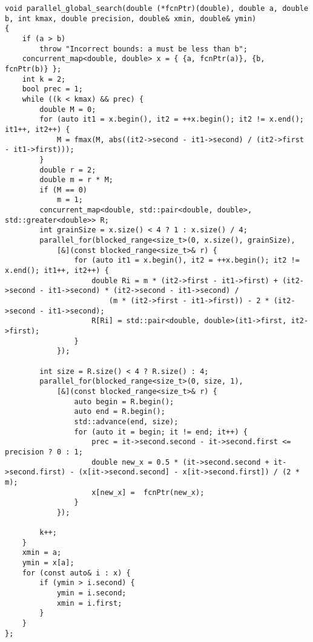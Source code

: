 \documentclass{report}
\begin{document}
\begin{lstlisting}
void parallel_global_search(double (*fcnPtr)(double), double a, double b, int kmax, double precision, double& xmin, double& ymin)
{
    if (a > b)
        throw "Incorrect bounds: a must be less than b";
    concurrent_map<double, double> x = { {a, fcnPtr(a)}, {b, fcnPtr(b)} };
    int k = 2;
    bool prec = 1;
    while ((k < kmax) && prec) {
        double M = 0;
        for (auto it1 = x.begin(), it2 = ++x.begin(); it2 != x.end(); it1++, it2++) {
            M = fmax(M, abs((it2->second - it1->second) / (it2->first - it1->first)));
        }
        double r = 2;
        double m = r * M;
        if (M == 0)
            m = 1;
        concurrent_map<double, std::pair<double, double>, std::greater<double>> R;
        int grainSize = x.size() < 4 ? 1 : x.size() / 4;
        parallel_for(blocked_range<size_t>(0, x.size(), grainSize),
            [&](const blocked_range<size_t>& r) {
                for (auto it1 = x.begin(), it2 = ++x.begin(); it2 != x.end(); it1++, it2++) {
                    double Ri = m * (it2->first - it1->first) + (it2->second - it1->second) * (it2->second - it1->second) /
                        (m * (it2->first - it1->first)) - 2 * (it2->second - it1->second);
                    R[Ri] = std::pair<double, double>(it1->first, it2->first);
                }
            });

        int size = R.size() < 4 ? R.size() : 4;
        parallel_for(blocked_range<size_t>(0, size, 1),
            [&](const blocked_range<size_t>& r) {
                auto begin = R.begin();
                auto end = R.begin(); 
                std::advance(end, size);
                for (auto it = begin; it != end; it++) {
                    prec = it->second.second - it->second.first <= precision ? 0 : 1;
                    double new_x = 0.5 * (it->second.second + it->second.first) - (x[it->second.second] - x[it->second.first]) / (2 * m);
                    x[new_x] =  fcnPtr(new_x);
                }
            });

        k++;
    }
    xmin = a;
    ymin = x[a];
    for (const auto& i : x) {
        if (ymin > i.second) {
            ymin = i.second;
            xmin = i.first;
        }
    }
};
\end{lstlisting}
\end{document}
